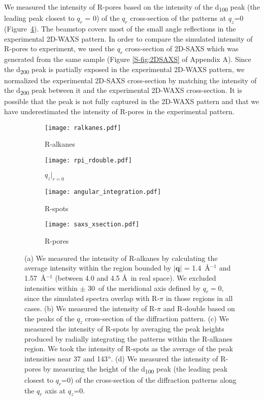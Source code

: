   We measured the intensity of R-pores based on the intensity of the
  d\textsubscript{100} peak (the leading peak closest to $q_r$ = 0) of the $q_r$
  cross-section of the patterns at $q_z$=0 (Figure~\ref{fig:saxs_xsection}). The
  beamstop covers most of the small angle reflections in the experimental 2D-WAXS
  pattern. In order to compare the simulated intensity of R-pores to experiment,
  we used the $q_r$ cross-section of 2D-SAXS which was generated from the same
  sample (Figure \ref{S-fig:2DSAXS} of Appendix A). Since the d\textsubscript{200} peak is
  partially exposed in the experimental 2D-WAXS pattern, we normalized the
  experimental 2D-SAXS cross-section by matching the intensity of the
  d\textsubscript{200} peak between it and the experimental 2D-WAXS
  cross-section. It is possible that the peak is not fully captured in the 2D-WAXS
  pattern and that we have underestimated the intensity of R-pores in the
  experimental pattern.     

  \begin{figure}[!htb]
  \centering
  \begin{subfigure}{0.45\linewidth}
  \centering
  \texttt{[image: ralkanes.pdf]}  %
  \caption{R-alkanes}\label{fig:ralkanes}
  \end{subfigure}
  \begin{subfigure}{0.45\linewidth}
  \centering
  \texttt{[image: rpi\_rdouble.pdf]}  %
  \caption{$q_z|_{r=0}$}\label{fig:rpi_rdouble}
  \end{subfigure}
  \begin{subfigure}{0.45\linewidth}
  \centering
  \texttt{[image: angular\_integration.pdf]} %
  \caption{R-spots}\label{fig:rspots}
  \end{subfigure}
  \begin{subfigure}{0.45\linewidth}
  \centering
  \texttt{[image: saxs\_xsection.pdf]}  %
  \caption{R-pores}\label{fig:saxs_xsection}
  \end{subfigure}
  \caption{(a) We measured the intensity of R-alkanes by calculating the
average intensity within the region bounded by $|\mathbf{q}|$ = 1.4~\AA$^{-1}$
and 1.57~\AA$^{-1}$ (between 4.0 and 4.5 \AA~in real space). We excluded
intensities within $\pm$ 30\degree~of the meridional axis defined by $q_r=0$,
since the simulated spectra overlap with R-$\pi$ in those regions in all cases.
(b) We measured the intensity of R-$\pi$ and R-double based on the peaks of the
$q_z$ cross-section of the diffraction pattern. (c) We measured the intensity
of R-spots by averaging the peak heights produced by radially integrating the
patterns within the R-alkanes region. We took the intensity of R-spots as the
average of the peak intensities near 37 and 143$\degree$. (d) We measured the
intensity of R-pores by measuring the height of the d\textsubscript{100} peak
(the leading peak closest to $q_r$=0) of the cross-section of the diffraction
patterns along the $q_r$ axis at $q_z$=0.
  } \label{fig:xrd_intensities}
  \end{figure}
 
